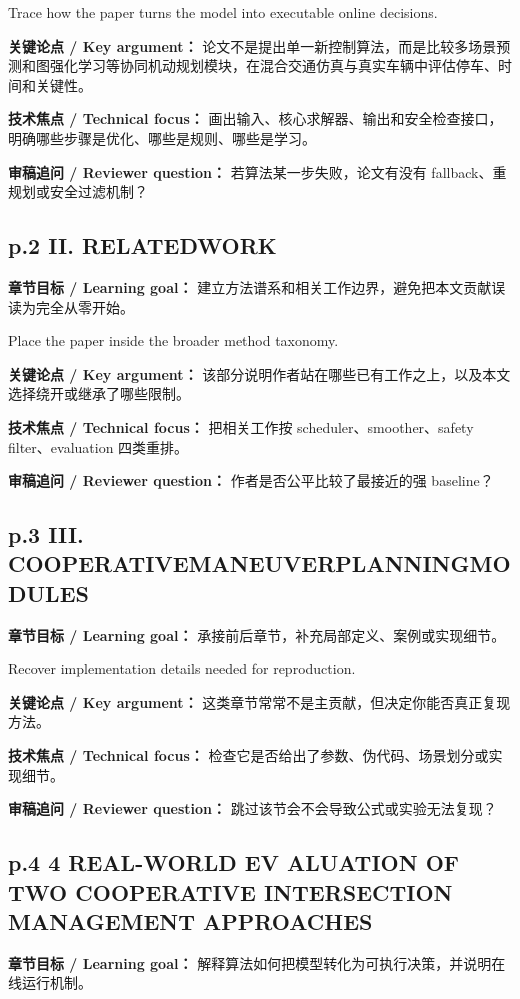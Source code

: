 \documentclass[UTF8,a4paper,11pt,fontset=fandol]{ctexart}
\begin{document}
Trace how the paper turns the model into executable online decisions.

\textbf{关键论点 / Key argument：} 论文不是提出单一新控制算法，而是比较多场景预测和图强化学习等协同机动规划模块，在混合交通仿真与真实车辆中评估停车、时间和关键性。

\textbf{技术焦点 / Technical focus：} 画出输入、核心求解器、输出和安全检查接口，明确哪些步骤是优化、哪些是规则、哪些是学习。

\textbf{审稿追问 / Reviewer question：} 若算法某一步失败，论文有没有 fallback、重规划或安全过滤机制？

\subsection*{p.2 II. RELATEDWORK}
\textbf{章节目标 / Learning goal：} 建立方法谱系和相关工作边界，避免把本文贡献误读为完全从零开始。

Place the paper inside the broader method taxonomy.

\textbf{关键论点 / Key argument：} 该部分说明作者站在哪些已有工作之上，以及本文选择绕开或继承了哪些限制。

\textbf{技术焦点 / Technical focus：} 把相关工作按 scheduler、smoother、safety filter、evaluation 四类重排。

\textbf{审稿追问 / Reviewer question：} 作者是否公平比较了最接近的强 baseline？

\subsection*{p.3 III. COOPERATIVEMANEUVERPLANNINGMODULES}
\textbf{章节目标 / Learning goal：} 承接前后章节，补充局部定义、案例或实现细节。

Recover implementation details needed for reproduction.

\textbf{关键论点 / Key argument：} 这类章节常常不是主贡献，但决定你能否真正复现方法。

\textbf{技术焦点 / Technical focus：} 检查它是否给出了参数、伪代码、场景划分或实现细节。

\textbf{审稿追问 / Reviewer question：} 跳过该节会不会导致公式或实验无法复现？

\subsection*{p.4 4 REAL-WORLD EV ALUATION OF TWO COOPERATIVE INTERSECTION MANAGEMENT APPROACHES}
\textbf{章节目标 / Learning goal：} 解释算法如何把模型转化为可执行决策，并说明在线运行机制。
\end{document}
